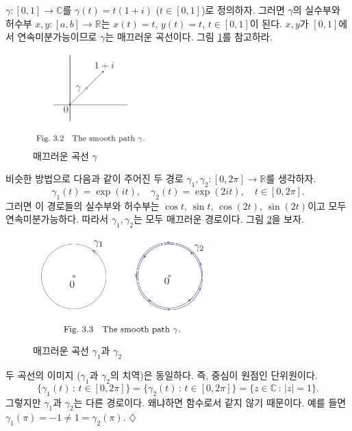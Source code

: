 \begin{salt_example} \label{example-3-1}
$\gamma : [0,1] \to \mathbb C$를 
$\gamma(t) = t(1+i)$ ($t\in[0,1]$)로 정의하자.
그러면 $\gamma$의 실수부와 허수부  $x,y: [a,b] \to \mathbb R$는
$x(t)=t$, $y(t)=t$, $t\in [0,1]$이 된다.
$x, y$가 $[0,1]$에서 연속미분가능이므로 $\gamma$는 매끄러운 곡선이다.
그림 \ref{fig-3-2}를 참고하라.
\begin{figure}[!h]
\begin{center}
\includegraphics[width=0.4\textwidth]{./SaltChapter/fig-3-2}
\end{center}
\caption{매끄러운 곡선 $\gamma$}
\label{fig-3-2}
\end{figure}
비슷한 방법으로 다음과 같이 주어진 두 경로  $\gamma_1, \gamma_2: [0,2\pi] \to \mathbb R$를
생각하자.
\[
\gamma_1(t) = \exp(it), \quad \gamma_2(t) = \exp(2it), \quad t\in [0,2\pi].
\]
그러면 이 경로들의 실수부와 허수부는
$\cos t$, $\sin t$, $\cos(2t)$, $\sin(2t)$이고
모두 연속미분가능하다.
따라서 $\gamma_1, \gamma_2$는 모두 매끄러운 경로이다.
그림 \ref{fig-3-3}을 보자.
\begin{figure}[!h]
\begin{center}
\includegraphics[width=0.6\textwidth]{./SaltChapter/fig-3-3}
\end{center}
\caption{매끄러운 곡선 $\gamma_1$과 $\gamma_2$}
\label{fig-3-3}
\end{figure}
두 곡선의 이미지 ($\gamma_1$과 $\gamma_2$의 치역)은 동일하다.
즉, 중심이 원점인 단위원이다.
\[
\{\gamma_1(t) \,:\, t\in[0,2\pi]\}  
= \{\gamma_2(t) \,:\, t\in[0,2\pi]\}  
= \{z\in\mathbb C \,:\, |z|=1 \}. 
\] 
그렇지만 $\gamma_1$과 $\gamma_2$는 다른 경로이다.
왜냐하면 함수로서 같지 않기 때문이다. 예를 들면
$\gamma_1(\pi) = -1 \ne 1 = \gamma_2(\pi)$.
\hfill $\diamondsuit$
\end{salt_example}

